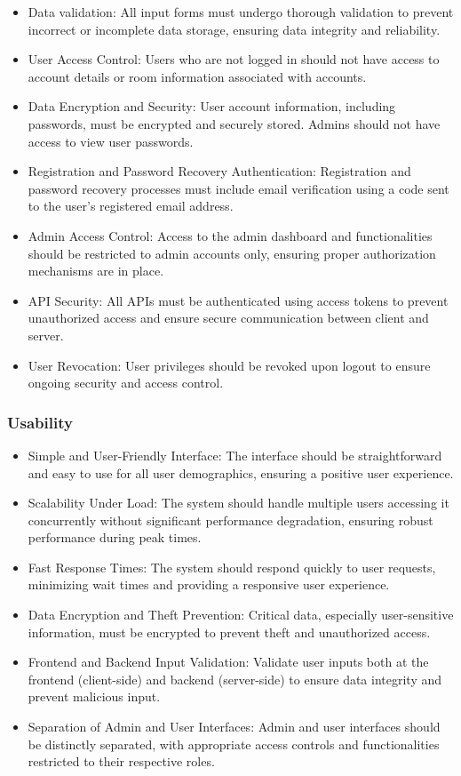\documentclass[../Main.tex]{subfiles}
\begin{document}
\begin{itemize}
    \item Data validation: All input forms must undergo thorough validation to prevent incorrect or incomplete data storage, ensuring data integrity and reliability.
    \item User Access Control: Users who are not logged in should not have access to account details or room information associated with accounts.
    \item Data Encryption and Security: User account information, including passwords, must be encrypted and securely stored.
          Admins should not have access to view user passwords.
    \item Registration and Password Recovery Authentication: Registration and password recovery processes must include email verification using a code sent to the user's registered email address.
    \item Admin Access Control: Access to the admin dashboard and functionalities should be restricted to admin accounts only, ensuring proper authorization mechanisms are in place.
    \item API Security: All APIs must be authenticated using access tokens to prevent unauthorized access and ensure secure communication between client and server.
    \item User Revocation: User privileges should be revoked upon logout to ensure ongoing security and access control.
\end{itemize}

\subsubsection{Usability}

\begin{itemize}
    \item Simple and User-Friendly Interface: The interface should be straightforward and easy to use for all user demographics, ensuring a positive user experience.
    \item Scalability Under Load: The system should handle multiple users accessing it concurrently without significant performance degradation, ensuring robust performance during peak times.
    \item Fast Response Times: The system should respond quickly to user requests, minimizing wait times and providing a responsive user experience.
    \item Data Encryption and Theft Prevention: Critical data, especially user-sensitive information, must be encrypted to prevent theft and unauthorized access.
    \item Frontend and Backend Input Validation: Validate user inputs both at the frontend (client-side) and backend (server-side) to ensure data integrity and prevent malicious input.
    \item Separation of Admin and User Interfaces: Admin and user interfaces should be distinctly separated, with appropriate access controls and functionalities restricted to their respective roles.
\end{itemize}
\end{document}
